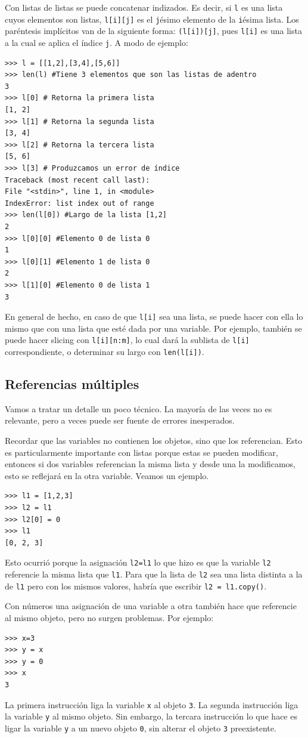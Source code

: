 \documentclass[a4paper, 12pt]{report}
\theoremstyle{definition}
\begin{document}
Con listas de listas se puede concatenar indizados. Es decir, si {\tt l} es una lista cuyos elementos son listas, {\tt l[i][j]} es el {\tt j}ésimo elemento de la {\tt i}ésima lista. Los paréntesis implícitos van de la siguiente forma: {\tt (l[i])[j]}, pues {\tt l[i]} es una lista a la cual se aplica el índice {\tt j}. A modo de ejemplo:
\begin{verbatim}
>>> l = [[1,2],[3,4],[5,6]]
>>> len(l) #Tiene 3 elementos que son las listas de adentro
3
>>> l[0] # Retorna la primera lista
[1, 2]
>>> l[1] # Retorna la segunda lista
[3, 4]
>>> l[2] # Retorna la tercera lista
[5, 6]
>>> l[3] # Produzcamos un error de índice
Traceback (most recent call last):
File "<stdin>", line 1, in <module>
IndexError: list index out of range
>>> len(l[0]) #Largo de la lista [1,2]
2
>>> l[0][0] #Elemento 0 de lista 0
1
>>> l[0][1] #Elemento 1 de lista 0
2
>>> l[1][0] #Elemento 0 de lista 1
3
\end{verbatim}
En general de hecho, en caso de que {\tt l[i]} sea una lista, se puede hacer con ella lo mismo que con una lista que esté dada por una variable. Por ejemplo, también se puede hacer slicing con {\tt l[i][n:m]}, lo cual dará la sublista de {\tt l[i]} correspondiente, o determinar su largo con {\tt len(l[i])}.
\subsection{Referencias múltiples}\label{sec-memoriaCompartida}

Vamos a tratar un detalle un poco técnico. La mayoría de las veces no es relevante, pero a veces puede ser fuente de errores inesperados.

Recordar que las variables no contienen los objetos, sino que los referencian. Esto es particularmente importante con listas porque estas se pueden modificar, entonces si dos variables referencian la misma lista y desde una la modificamos, esto se reflejará en la otra variable. Veamos un ejemplo.
\begin{verbatim}
>>> l1 = [1,2,3]
>>> l2 = l1
>>> l2[0] = 0
>>> l1
[0, 2, 3]
\end{verbatim}
Esto ocurrió porque la asignación {\tt l2=l1} lo que hizo es que la variable {\tt l2} referencie la misma lista que {\tt l1}. Para que la lista de {\tt l2} sea una lista distinta a la de {\tt l1} pero con los mismos valores, habría que escribir {\tt l2 = l1.copy()}.

Con números una asignación de una variable a otra también hace que referencie al mismo objeto, pero no surgen problemas. Por ejemplo:
\begin{verbatim}
>>> x=3
>>> y = x
>>> y = 0
>>> x
3
\end{verbatim}
La primera instrucción liga la variable {\tt x} al objeto {\tt 3}. La segunda instrucción liga la variable {\tt y} al mismo objeto. Sin embargo, la tercara instrucción lo que hace es ligar la variable {\tt y} a un nuevo objeto {\tt 0}, sin alterar el objeto {\tt 3} preexistente.
\end{document}
